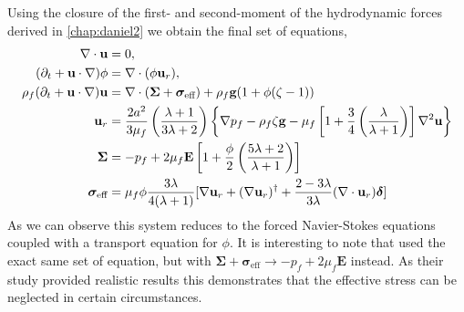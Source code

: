 Using the closure of the first- and second-moment of the hydrodynamic forces derived in \ref{chap:daniel2} we obtain the final set of equations, 
\begin{align}
    \mathbf{\nabla}\cdot\textbf{u}&=0, \\
    (\partial_t + \textbf{u}\cdot \mathbf{\nabla})\phi &= \mathbf{\nabla}\cdot(\phi \textbf{u}_r), \\
    \rho_f (\partial_t 
    + \textbf{u}\cdot \mathbf{\nabla})
    \textbf{u}
    &= 
    \mathbf{\nabla}\cdot (\bm\Sigma + \bm{\sigma}_\text{eff})
    + \rho_f \textbf{g} (1 + \phi(\zeta-1) )\\
    \textbf{u}_{r} 
    &= 
    \frac{2 a^2}{3\mu_f}\left(\frac{\lambda+1}{3\lambda+2}\right)
    \left\{
        \mathbf{\nabla} p_f
        - \rho_f\zeta   \textbf{g}
        -  \mu_f \left[
            1 + \frac{3}{4} \left(\frac{\lambda}{\lambda+1}\right)
            \right]\mathbf{\nabla}^2 \textbf{u}
    \right\}
    \\
    \bm\Sigma& = 
    - p_f +2\mu_f  \textbf{E} \left[1 + \frac{\phi}{2}\left(\frac{5\lambda +2}{\lambda +1}\right)\right] \\
    \bm\sigma_\text{eff} &= \mu_f \phi      
    \frac{3\lambda}{4(\lambda + 1)}[\mathbf{\nabla} \textbf{u}_{r} +(\mathbf{\nabla} \textbf{u}_{r})^\dagger +\frac{2-3\lambda}{3\lambda}(\mathbf{\nabla}\cdot  \textbf{u}_{r})\bm\delta] 
\end{align}
As we can observe this system reduces to the forced Navier-Stokes equations coupled with a transport equation for $\phi$. 
It is interesting to note that \citet{kriaa2023two} used the exact same set of equation, but with $\bm\Sigma + \bm\sigma_\text{eff} \to -p_f +2 \mu_f \textbf{E}$ instead. 
As their study provided realistic results this demonstrates that the effective stress can be neglected in certain circumstances. 




